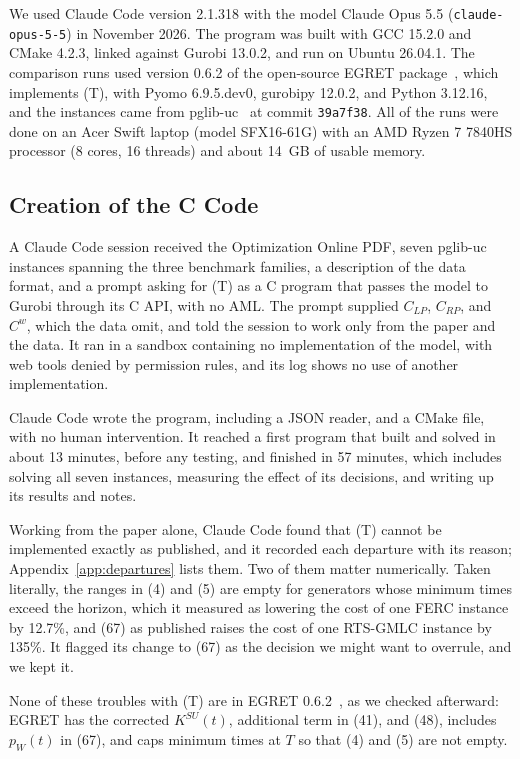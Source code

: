\documentclass[11pt]{article}
\begin{document}
We used Claude Code version 2.1.318 with the model Claude Opus 5.5 (\texttt{claude-opus-5-5}) in November 2026. The program was built with GCC 15.2.0 and CMake 4.2.3, linked against Gurobi 13.0.2, and run on Ubuntu 26.04.1. The comparison runs used version 0.6.2 of the open-source EGRET package~\cite{egret}, which implements (T), with Pyomo 6.9.5.dev0, gurobipy 12.0.2, and Python 3.12.16, and the instances came from pglib-uc~\cite{pglibuc} at commit \texttt{39a7f38}. All of the runs were done on an Acer Swift laptop (model SFX16-61G) with an AMD Ryzen 7 7840HS processor (8 cores, 16 threads) and about 14~GB of usable memory.

\subsection{Creation of the C Code}
\label{sec:creation}

A Claude Code session received the Optimization Online PDF, seven pglib-uc instances spanning the three benchmark families, a description of the data format, and a prompt asking for (T) as a C program that passes the model to Gurobi through its C API, with no AML. The prompt supplied $C_{LP}$, $C_{RP}$, and $C^w$, which the data omit, and told the session to work only from the paper and the data. It ran in a sandbox containing no implementation of the model, with web tools denied by permission rules, and its log shows no use of another implementation.

Claude Code wrote the program, including a JSON reader, and a CMake file, with no human intervention. It reached a first program that built and solved in about 13 minutes, before any testing, and finished in 57 minutes, which includes solving all seven instances, measuring the effect of its decisions, and writing up its results and notes.

Working from the paper alone, Claude Code found that (T) cannot be implemented exactly as published, and it recorded each departure with its reason; Appendix~\ref{app:departures} lists them. Two of them matter numerically. Taken literally, the ranges in (4) and (5) are empty for generators whose minimum times exceed the horizon, which it measured as lowering the cost of one FERC instance by 12.7\%, and (67) as published raises the cost of one RTS-GMLC instance by 135\%. It flagged its change to (67) as the decision we might want to overrule, and we kept it.

None of these troubles with (T) are in EGRET 0.6.2~\cite{egret}, as we checked afterward: EGRET has the corrected $K^{SU}(t)$, additional term in (41), and (48), includes $p_W(t)$ in (67), and caps minimum times at $T$ so that (4) and (5) are not empty.
\end{document}
